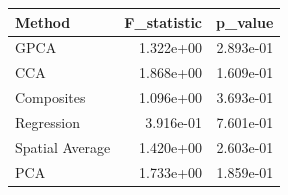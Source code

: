 \begin{tabular}{lrr}
\toprule
Method & F_statistic & p_value \\
\midrule
GPCA & 1.322e+00 & 2.893e-01 \\
CCA & 1.868e+00 & 1.609e-01 \\
Composites & 1.096e+00 & 3.693e-01 \\
Regression & 3.916e-01 & 7.601e-01 \\
Spatial Average & 1.420e+00 & 2.603e-01 \\
PCA & 1.733e+00 & 1.859e-01 \\
\bottomrule
\end{tabular}
